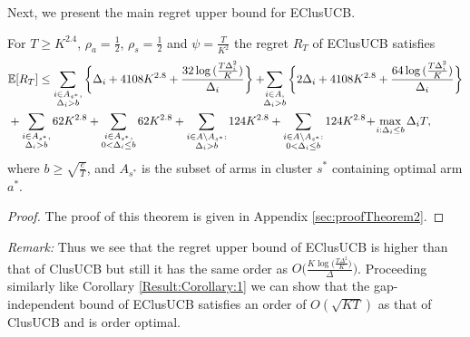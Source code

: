 Next, we present the main regret upper bound for EClusUCB.

\begin{theorem}
\label{Result:Theorem:2}
For $T\geq K^{2.4} $, $\rho_a =\frac{1}{2}$, $\rho_s =\frac{1}{2}$ and $\psi=\frac{T}{K^2}$ the regret $R_T$ of EClusUCB satisfies
\begin{align*}
&\mathbb{E} [R_{T}]\leq 
\sum\limits_{\substack{i\in A_{s^{*}},\\\Delta_{i} > b}}\bigg\lbrace \Delta_{i} + 4108K^{2.8}
+ \frac{32\log{(\frac{T\Delta_i^2}{K})}}{\Delta_{i}} \bigg\rbrace
 + \! \! \sum\limits_{\substack{i\in A,\\\Delta_{i} > b}} \bigg\lbrace 2\Delta_{i} +
4108K^{2.8} + \frac{64\log{(\frac{T\Delta_i^2}{K})}}{\Delta_{i}} \bigg\rbrace \\
&+ \sum\limits_{\substack{i\in A_{s^{*}},\\ \Delta_{i} > b}} 
62K^{2.8}+\sum\limits_{\substack{i\in A_{s^{*}},\\0 < \Delta_{i}\leq b}} 62K^{2.8} + \sum_{\substack{i\in A\setminus A_{s^*}:\\\Delta_{i}> b}}124K^{2.8} +\sum_{\substack{i\in A \setminus A_{s^*}:\\ 0 < \Delta_{i} \leq b}}124K^{2.8} 
 \!+\! \max\limits_{i:\Delta_{i}\leq b}\Delta_{i}T, 
\end{align*}
where $b\geq \sqrt{\frac{e}{T}}$, and $A_{s^{*}}$ is the subset of arms in cluster $s^{*}$ containing optimal arm $a^{*}$.
\end{theorem}

\begin{proof}
The proof of this theorem is given in Appendix \ref{sec:proofTheorem2}.
\end{proof}

\textit{Remark:} Thus we see that the regret upper bound of EClusUCB is higher than that of ClusUCB but still it has the same order as $O\bigg(\frac{K\log \big(\frac{T\Delta^{2}}{K}\big)}{\Delta}\bigg)$. Proceeding similarly like Corollary \ref{Result:Corollary:1} we can show that the gap-independent bound of EClusUCB satisfies an order of $O\left( \sqrt{KT}\right)$ as that of ClusUCB and is order optimal.
